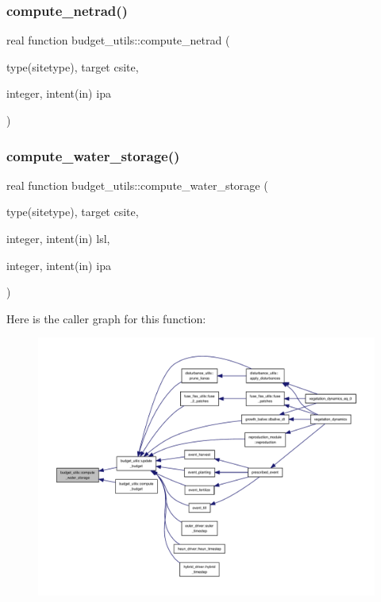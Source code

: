 \subsubsection{\texorpdfstring{compute\+\_\+netrad()}{compute\_netrad()}}
{\footnotesize\ttfamily real function budget\+\_\+utils\+::compute\+\_\+netrad (\begin{DoxyParamCaption}\item[{type(sitetype), target}]{csite,  }\item[{integer, intent(in)}]{ipa }\end{DoxyParamCaption})}

\mbox{\label{namespacebudget__utils_ad0c764047c557100b3a3cdcd836103a0}} 
\subsubsection{\texorpdfstring{compute\+\_\+water\+\_\+storage()}{compute\_water\_storage()}}
{\footnotesize\ttfamily real function budget\+\_\+utils\+::compute\+\_\+water\+\_\+storage (\begin{DoxyParamCaption}\item[{type(sitetype), target}]{csite,  }\item[{integer, intent(in)}]{lsl,  }\item[{integer, intent(in)}]{ipa }\end{DoxyParamCaption})}

Here is the caller graph for this function\+:
\nopagebreak
\begin{figure}[H]
\begin{center}
\leavevmode
\includegraphics[width=350pt]{namespacebudget__utils_ad0c764047c557100b3a3cdcd836103a0_icgraph}
\end{center}
\end{figure}
\mbox{\label{namespacebudget__utils_ae7ad8d90c28490b0b1c920e7a2656345}} 

